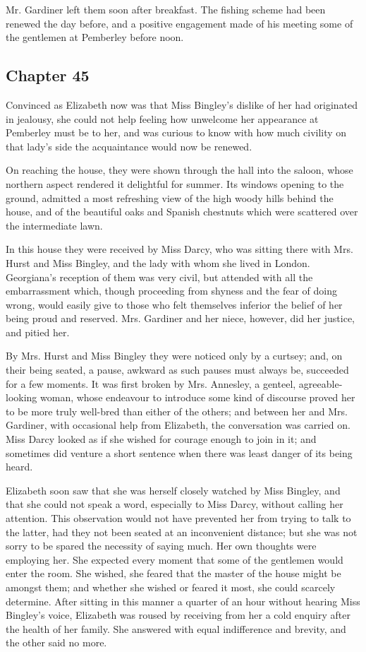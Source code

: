 Mr. Gardiner left them soon after breakfast. The fishing scheme had been renewed the day before, and a positive engagement made of his meeting some of the gentlemen at Pemberley before noon.

\subsection[chapter-45]{\useURL[url45][][][]\from[url45] Chapter 45}

Convinced as Elizabeth now was that Miss Bingley's dislike of her had originated in jealousy, she could not help feeling how unwelcome her appearance at Pemberley must be to her, and was curious to know with how much civility on that lady's side the acquaintance would now be renewed.

On reaching the house, they were shown through the hall into the saloon, whose northern aspect rendered it delightful for summer. Its windows opening to the ground, admitted a most refreshing view of the high woody hills behind the house, and of the beautiful oaks and Spanish chestnuts which were scattered over the intermediate lawn.

In this house they were received by Miss Darcy, who was sitting there with Mrs. Hurst and Miss Bingley, and the lady with whom she lived in London. Georgiana's reception of them was very civil, but attended with all the embarrassment which, though proceeding from shyness and the fear of doing wrong, would easily give to those who felt themselves inferior the belief of her being proud and reserved. Mrs. Gardiner and her niece, however, did her justice, and pitied her.

By Mrs. Hurst and Miss Bingley they were noticed only by a curtsey; and, on their being seated, a pause, awkward as such pauses must always be, succeeded for a few moments. It was first broken by Mrs. Annesley, a genteel, agreeable-looking woman, whose endeavour to introduce some kind of discourse proved her to be more truly well-bred than either of the others; and between her and Mrs. Gardiner, with occasional help from Elizabeth, the conversation was carried on. Miss Darcy looked as if she wished for courage enough to join in it; and sometimes did venture a short sentence when there was least danger of its being heard.

Elizabeth soon saw that she was herself closely watched by Miss Bingley, and that she could not speak a word, especially to Miss Darcy, without calling her attention. This observation would not have prevented her from trying to talk to the latter, had they not been seated at an inconvenient distance; but she was not sorry to be spared the necessity of saying much. Her own thoughts were employing her. She expected every moment that some of the gentlemen would enter the room. She wished, she feared that the master of the house might be amongst them; and whether she wished or feared it most, she could scarcely determine. After sitting in this manner a quarter of an hour without hearing Miss Bingley's voice, Elizabeth was roused by receiving from her a cold enquiry after the health of her family. She answered with equal indifference and brevity, and the other said no more.


